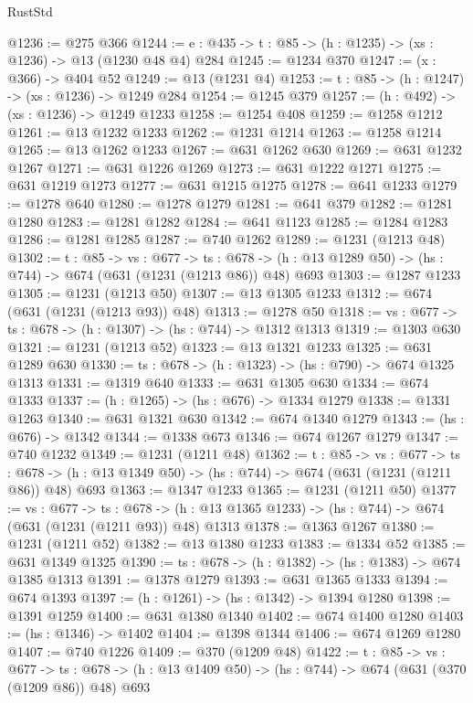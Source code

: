 \begin{lexlean}{RustStd}
\begin{coremodule}
@1236 := @275 @366
@1244 := {e : @435} -> {t : @85} -> (h : @1235) -> (xs : @1236) -> @13 (@1230 @48 @4) @284
@1245 := @1234 @370
@1247 := (x : @366) -> @404 @52
@1249 := @13 (@1231 @4)
@1253 := {t : @85} -> (h : @1247) -> (xs : @1236) -> @1249 @284
@1254 := @1245 @379
@1257 := (h : @492) -> (xs : @1236) -> @1249 @1233
@1258 := @1254 @408
@1259 := @1258 @1212
@1261 := @13 @1232 @1233
@1262 := @1231 @1214
@1263 := @1258 @1214
@1265 := @13 @1262 @1233
@1267 := @631 @1262 @630
@1269 := @631 @1232 @1267
@1271 := @631 @1226 @1269
@1273 := @631 @1222 @1271
@1275 := @631 @1219 @1273
@1277 := @631 @1215 @1275
@1278 := @641 @1233
@1279 := @1278 @640
@1280 := @1278 @1279
@1281 := @641 @379
@1282 := @1281 @1280
@1283 := @1281 @1282
@1284 := @641 @1123
@1285 := @1284 @1283
@1286 := @1281 @1285
@1287 := @740 @1262
@1289 := @1231 (@1213 @48)
@1302 := {t : @85} ->
  {vs : @677} ->
  {ts : @678} -> (h : @13 @1289 @50) -> (hs : @744) -> @674 (@631 (@1231 (@1213 @86)) @48) @693
@1303 := @1287 @1233
@1305 := @1231 (@1213 @50)
@1307 := @13 @1305 @1233
@1312 := @674 (@631 (@1231 (@1213 @93)) @48)
@1313 := @1278 @50
@1318 := {vs : @677} -> {ts : @678} -> (h : @1307) -> (hs : @744) -> @1312 @1313
@1319 := @1303 @630
@1321 := @1231 (@1213 @52)
@1323 := @13 @1321 @1233
@1325 := @631 @1289 @630
@1330 := {ts : @678} -> (h : @1323) -> (hs : @790) -> @674 @1325 @1313
@1331 := @1319 @640
@1333 := @631 @1305 @630
@1334 := @674 @1333
@1337 := (h : @1265) -> (hs : @676) -> @1334 @1279
@1338 := @1331 @1263
@1340 := @631 @1321 @630
@1342 := @674 @1340 @1279
@1343 := (hs : @676) -> @1342
@1344 := @1338 @673
@1346 := @674 @1267 @1279
@1347 := @740 @1232
@1349 := @1231 (@1211 @48)
@1362 := {t : @85} ->
  {vs : @677} ->
  {ts : @678} -> (h : @13 @1349 @50) -> (hs : @744) -> @674 (@631 (@1231 (@1211 @86)) @48) @693
@1363 := @1347 @1233
@1365 := @1231 (@1211 @50)
@1377 := {vs : @677} ->
  {ts : @678} -> (h : @13 @1365 @1233) -> (hs : @744) -> @674 (@631 (@1231 (@1211 @93)) @48) @1313
@1378 := @1363 @1267
@1380 := @1231 (@1211 @52)
@1382 := @13 @1380 @1233
@1383 := @1334 @52
@1385 := @631 @1349 @1325
@1390 := {ts : @678} -> (h : @1382) -> (hs : @1383) -> @674 @1385 @1313
@1391 := @1378 @1279
@1393 := @631 @1365 @1333
@1394 := @674 @1393
@1397 := (h : @1261) -> (hs : @1342) -> @1394 @1280
@1398 := @1391 @1259
@1400 := @631 @1380 @1340
@1402 := @674 @1400 @1280
@1403 := (hs : @1346) -> @1402
@1404 := @1398 @1344
@1406 := @674 @1269 @1280
@1407 := @740 @1226
@1409 := @370 (@1209 @48)
@1422 := {t : @85} ->
  {vs : @677} ->
  {ts : @678} -> (h : @13 @1409 @50) -> (hs : @744) -> @674 (@631 (@370 (@1209 @86)) @48) @693

\end{coremodule}
\end{lexlean}
